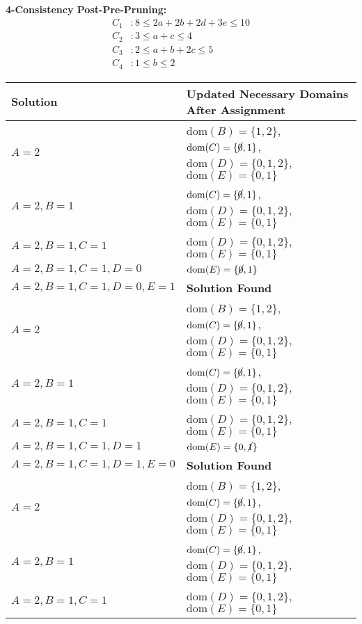 \begin{example} \textbf{4-Consistency Post-Pre-Pruning:}
    \[
        \begin{aligned}
            C_1 &: 8 \leq 2a + 2b + 2d + 3e \leq 10 \\
            C_2 &: 3 \leq a + c \leq 4 \\
            C_3 &: 2 \leq a + b + 2c \leq 5 \\
            C_4 &: 1 \leq b \leq 2
        \end{aligned}
    \]
    \begin{center}
        \begin{tabular}{ll}
            \textbf{Solution} & \textbf{Updated Necessary Domains After Assignment} \\
            \toprule   
            $A=2$ & $\text{dom}(B) = \{1,2\}$, $\text{dom}(C) = \{\cancel{0},1\}$, $\text{dom}(D) = \{0,1,2\}$, $\text{dom}(E) = \{0,1\}$ \\ 
            $A=2,B=1$ & $\text{dom}(C) = \{\cancel{0},1\}$, $\text{dom}(D) = \{0,1,2\}$, $\text{dom}(E) = \{0,1\}$ \\           
            $A=2,B=1,C=1$ & $\text{dom}(D) = \{0,1,2\}$, $\text{dom}(E) = \{0,1\}$ \\
            $A=2,B=1,C=1,D=0$ & $\text{dom}(E) = \{\cancel{0},1\}$ \\
            $A=2,B=1,C=1,D=0,E=1$ & \textbf{Solution Found} \\
            \midrule
            $A=2$ & $\text{dom}(B) = \{1,2\}$, $\text{dom}(C) = \{\cancel{0},1\}$, $\text{dom}(D) = \{0,1,2\}$, $\text{dom}(E) = \{0,1\}$ \\ 
            $A=2,B=1$ & $\text{dom}(C) = \{\cancel{0},1\}$, $\text{dom}(D) = \{0,1,2\}$, $\text{dom}(E) = \{0,1\}$ \\           
            $A=2,B=1,C=1$ & $\text{dom}(D) = \{0,1,2\}$, $\text{dom}(E) = \{0,1\}$ \\
            $A=2,B=1,C=1,D=1$ & $\text{dom}(E) = \{0,\cancel{1}\}$ \\
            $A=2,B=1,C=1,D=1,E=0$ & \textbf{Solution Found} \\
            \midrule
            $A=2$ & $\text{dom}(B) = \{1,2\}$, $\text{dom}(C) = \{\cancel{0},1\}$, $\text{dom}(D) = \{0,1,2\}$, $\text{dom}(E) = \{0,1\}$ \\ 
            $A=2,B=1$ & $\text{dom}(C) = \{\cancel{0},1\}$, $\text{dom}(D) = \{0,1,2\}$, $\text{dom}(E) = \{0,1\}$ \\           
            $A=2,B=1,C=1$ & $\text{dom}(D) = \{0,1,2\}$, $\text{dom}(E) = \{0,1\}$ \\

\end{tabular}
\end{center}
\end{example}

